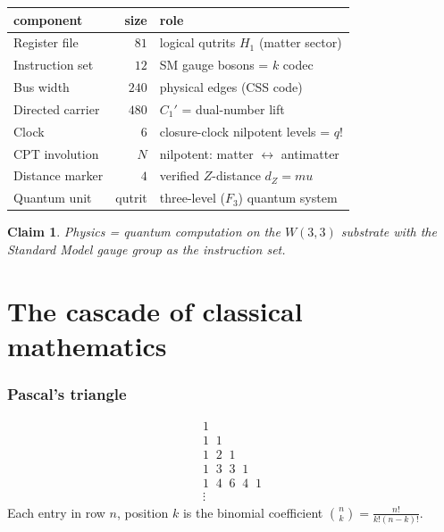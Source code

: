 \documentclass[11pt]{article}
\def\mathbb#1{#1}%
\def\textbf#1{#1}%
\def\mu{mu}%
\newtheorem*{claim}{Claim}
\begin{document}
\begin{center}
\renewcommand{\arraystretch}{1.4}
\begin{tabular}{l r l}
\toprule
\textbf{component} & \textbf{size} & \textbf{role} \\
\midrule
Register file & $81$ & logical qutrits $H_1$ (matter sector) \\
Instruction set & $12$ & SM gauge bosons = $k$ codec \\
Bus width & $240$ & physical edges (CSS code) \\
Directed carrier & $480$ & $C_1'$ = dual-number lift \\
Clock & $6$ & closure-clock nilpotent levels = $q!$ \\
CPT involution & $N$ & nilpotent: matter $\leftrightarrow$ antimatter \\
Distance marker & $4$ & verified $Z$-distance $d_Z=\mu$ \\
Quantum unit & qutrit & three-level ($\mathbb{F}_3$) quantum system \\
\bottomrule
\end{tabular}
\end{center}

\begin{claim}
Physics = quantum computation on the $W(3,3)$ substrate with the Standard Model gauge group as the instruction set.
\end{claim}

\part{The cascade of classical mathematics}

\section{Pascal's triangle}

\[
\begin{array}{c}
1 \\
1 \;\; 1 \\
1 \;\; 2 \;\; 1 \\
1 \;\; 3 \;\; 3 \;\; 1 \\
1 \;\; 4 \;\; 6 \;\; 4 \;\; 1 \\
\vdots
\end{array}
\]
Each entry in row $n$, position $k$ is the binomial coefficient $\binom{n}{k} = \tfrac{n!}{k!(n-k)!}$.
\end{document}
